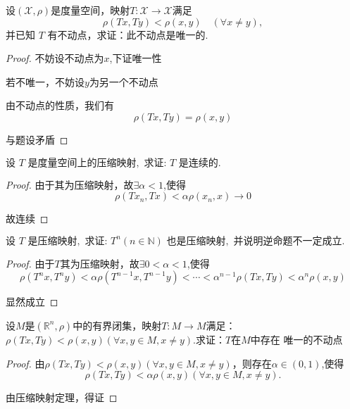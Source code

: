 \documentclass[lang=cn,10pt]{elegantbook}
\begin{document}
	\begin{exercise}
		设$(\mathscr{X},\rho)$是度量空间，映射$T:\mathscr{X}\to\mathscr{X}$满足
		\begin{equation*}
				\rho(Tx,Ty)<\rho(x,y)\quad(\forall x\neq y),
		\end{equation*}
		并已知 $T$ 有不动点，求证：此不动点是唯一的.
	\end{exercise}
	\begin{proof}
		不妨设不动点为$x$,下证唯一性
		
		若不唯一，不妨设$y$为另一个不动点
		
		由不动点的性质，我们有
		\begin{equation*}
			\rho(Tx,Ty)=\rho(x,y)
		\end{equation*}
		
		与题设矛盾
	\end{proof}
	\begin{exercise}
	$	\text{设 }T\text{ 是度量空间上的压缩映射},\text{ 求证: }T\text{ 是连续的}.$
	\end{exercise}
	\begin{proof}
		
		由于其为压缩映射，故$\exists \alpha <1$,使得
		\begin{equation*}
			\rho(Tx_n,Tx)<\alpha\rho(x_n,x)\rightarrow 0
		\end{equation*}
		
		故连续
	\end{proof}
	\begin{exercise}
	$\text{设 }T\text{ 是压缩映射},\text{ 求证: }T^n(n\in\mathbb{N})\text{ 也是压缩映射},\text{ 并}\text{说明逆命题不一定成立}.$
	\end{exercise}
	\begin{proof}
		
		由于$T$其为压缩映射，故$\exists 0<\alpha <1$,使得
		\begin{equation*}
			\rho \left( T^nx,T^ny \right) <\alpha \rho \left( T^{n-1}x,T^{n-1}y \right) <\cdots <\alpha ^{n-1}\rho \left( Tx,Ty \right) <\alpha ^n\rho \left( x,y \right) 
		\end{equation*}
		
		显然成立
	\end{proof}
	\begin{exercise}
		设$M$是$(\mathbb{R}^n,\rho)$中的有界闭集，映射$T:M\to M$满足：$\rho(Tx,Ty)<\rho(x,y)(\forall x,y\in M,x\neq y)$.求证：$T$在$M$中存在
		唯一的不动点
	\end{exercise}
	\begin{proof}
		
		由$\rho(Tx,Ty)<\rho(x,y)(\forall x,y\in M,x\neq y)$，则存在$\alpha\in(0,1)$,使得
		\begin{equation*}
			\rho(Tx,Ty)<\alpha\rho(x,y)(\forall x,y\in M,x\neq y).
		\end{equation*}
		
		由压缩映射定理，得证
	\end{proof}
\end{document}
